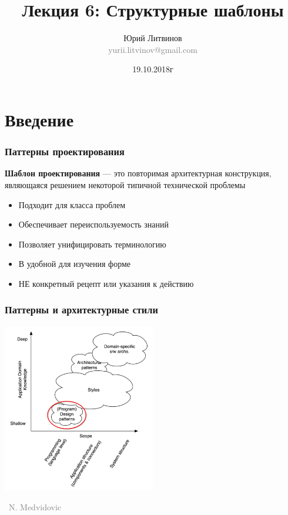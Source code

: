 \documentclass[xetex,mathserif,serif]{beamer}
\title[Структурные шаблоны]{Лекция 6: Структурные шаблоны}
\author[Юрий Литвинов]{Юрий Литвинов\\\small{\textcolor{gray}{yurii.litvinov@gmail.com}}}
\date{19.10.2018г}
\newcommand{\attribution}[1] {
	\vspace{-5mm}\begin{flushright}\begin{scriptsize}\textcolor{gray}{\textcopyright\, #1}\end{scriptsize}\end{flushright}
}
\begin{document}
	\frame{\titlepage}

	\section{Введение}

	\begin{frame}
		\frametitle{Паттерны проектирования}
		\textbf{Шаблон проектирования} --- это повторимая архитектурная конструкция, являющаяся решением некоторой типичной технической проблемы
		\begin{itemize}
			\item Подходит для класса проблем
			\item Обеспечивает переиспользуемость знаний
			\item Позволяет унифицировать терминологию
			\item В удобной для изучения форме
			\item НЕ конкретный рецепт или указания к действию
		\end{itemize}
	\end{frame}

	\begin{frame}
		\frametitle{Паттерны и архитектурные стили}
		\begin{center}
			\includegraphics[width=0.5\textwidth]{architecturalStylesPatternsHighlighted.png}
			\attribution{N. Medvidovic}
		\end{center}
	\end{frame}
\end{document}

